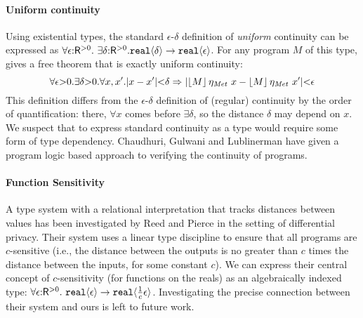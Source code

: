\paragraph{Uniform continuity}
Using %
existential types, %
the standard $\epsilon$-$\delta$ definition of
\emph{uniform} continuity can be expressed as %
$  \forall \epsilon \mathord: \mathsf{R}^{>0}.\ \exists \delta\mathord: \mathsf{R}^{>0}.\\ \textup{\texttt{real}}\langle \delta \rangle \to \textup{\texttt{real}}\langle \epsilon \rangle$.
For any program $M$ of this type, %
 gives a free theorem that is exactly 
uniform continuity:
\begin{displaymath}
  \forall \epsilon \mathord> 0. \exists \delta \mathord> 0. \forall x,x'. \lvert x - x' \rvert \mathord< \delta \Rightarrow \lvert \left\lfloor{M}\right\rfloor\eta_{\mathit{Met}}~x - \left\lfloor{M}\right\rfloor\eta_{\mathit{Met}}~x' \rvert \mathord< \epsilon
\end{displaymath}
This definition differs from the $\epsilon$-$\delta$ definition of
(regular) continuity by the order of quantification:
there, $\forall x$ comes before $\exists \delta$, so the distance
$\delta$ may depend on %
$x$. We suspect that to express standard continuity as a type would
require some form of type dependency. Chaudhuri, Gulwani and
Lublinerman \cite{chaudhuri10continuity} have given a program logic
based approach to verifying the continuity of programs.

\paragraph{Function Sensitivity}
A type system with a relational interpretation that tracks distances
between values has %
been investigated by Reed and Pierce \cite{reed10distance} in the
setting of differential privacy. Their system uses a linear type
discipline to ensure that all programs are $c$-sensitive (i.e., the
distance between the outputs is no greater than $c$ times the
distance between the inputs, for some constant $c$). We can express
their central concept of $c$-sensitivity (for functions on the reals)
as an algebraically indexed type: $\forall
\epsilon\mathord:\mathsf{R}^{>0}.\ \textup{\texttt{real}}\langle \epsilon \rangle \to
\textup{\texttt{real}}\langle \frac{1}{c}\epsilon \rangle$. Investigating the precise
connection between their system and ours is left to future work.


